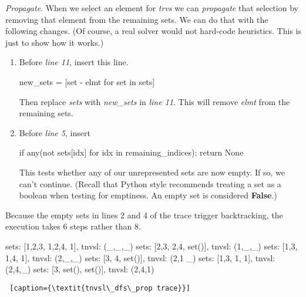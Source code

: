 \smallv
\noindent\textit{Propagate}. When we select an element for \textit{trvs} we can \textit{propagate} that selection by removing that element from the remaining sets. We can do that with the following changes. (Of course, a real solver would not hard-code heuristics. This is just to show how it works.)
\begin{enumerate}
    \item Before \textit{line 11}, insert this line.
  
\begin{minipage}[c]{0.45\textwidth}
\begin{python1}
new_sets = [set - {elmt} for set in sets]
\end{python1}
\end{minipage}

Then replace \textit{sets} with \textit{new\_sets} in \textit{line 11}.
This will remove \textit{elmt} from the remaining sets.

    \item Before \textit{line 5}, insert

\begin{minipage}[c]{0.45\textwidth}
\begin{python1}
if any(not sets[idx] for idx in remaining_indices):
  return None
\end{python1}
\end{minipage}


This tests whether any of our unrepresented sets are now empty. If so, we can't continue. (Recall that Python style recommends treating a set as a boolean when testing for emptiness. An empty set is considered \textbf{False}.)


\end{enumerate}

Because the empty sets in lines 2 and 4 of the trace trigger backtracking, the execution takes 6 steps rather than 8.

\begin{flushright}
\begin{minipage}[c]{0.45\textwidth}
\begin{python1}  
sets: [{1,2,3}, {1,2,4}, {1}], tnvsl: (_,_,_)
  sets: [{2,3}, {2,4}, set()], tnvsl: (1,_,_)
  sets: [{1,3}, {1,4}, {1}], tnvsl: (2,_,_)
    sets: [{3}, {4}, set()], tnvsl: (2,1 _)
    sets: [{1,3}, {1}, {1}], tnvsl: (2,4,_)
      sets: [{3}, set(), set()], tnvsl: (2,4,1)
\end{python1}\linv
\begin{lstlisting} [caption={\textit{tnvsl\_dfs\_prop trace}}]
\end{lstlisting}
\end{minipage}
\end{flushright}


